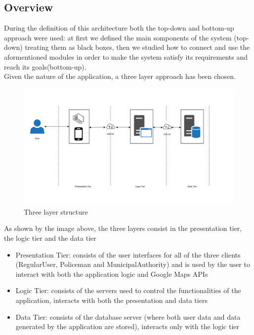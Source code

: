 \subsection{Overview}
During the definition of this architecture both the top-down and bottom-up approach were used: at first we defined the main somponents of the system (top-down) treating them as black boxes, then we studied how to connect and use the aformentioned modules in order to make the system satisfy its requirements and reach its goals(bottom-up).\\
Given the nature of the application, a three layer approach has been chosen.\newline
\begin{figure}[h!]
	\centering
	\includegraphics[width=\textwidth]{Images/three_layer}
	\caption{Three layer structure}
\end{figure}
\newline
As shown by the image above, the three layers consist in the presentation tier, the logic tier and the data tier
\begin{itemize}
\item Presentation Tier: consists of the user interfaces for all of the three clients (RegularUser, Policeman and MunicipalAuthority) and is used by the user to interact with both the application logic and Google Maps APIs \newline
\item Logic Tier: consists of the servers used to control the functionalities of the application, interacts with both the presentation and data tiers \newline
\item Data Tier: consists of the database server (where both user data and data generated by the application are stored), interacts only with the logic tier \newline
\end{itemize}
\newpage
